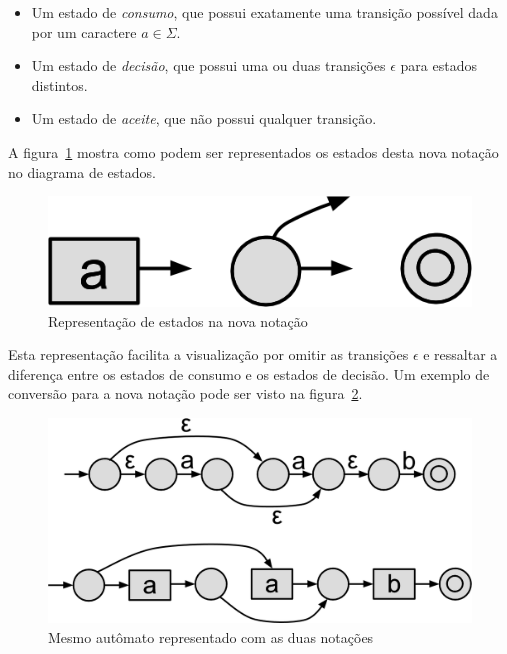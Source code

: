 \documentclass[a4paper,12pt,oneside,onecolumn]{uerj}
\begin{document}
\begin{itemize}
    \item Um estado de \emph{consumo}, que possui exatamente uma transição possível dada por um caractere $a \in \Sigma$.
    \item Um estado de \emph{decisão}, que possui uma ou duas transições $\epsilon$ para estados distintos.
    \item Um estado de \emph{aceite}, que não possui qualquer transição.
\end{itemize}

A figura~\ref{fig:nova_notacao} mostra como podem ser representados os estados desta nova notação no diagrama de estados.

\begin{figure}[ht]
  \centering
  \includegraphics[scale=0.5]{figures/nova_notacao.png}
  \caption{Representação de estados na nova notação}
  \label{fig:nova_notacao}
\end{figure}

Esta representação facilita a visualização por omitir as transições $\epsilon$ e ressaltar a diferença entre os estados de consumo e os estados de decisão. Um exemplo de conversão para a nova notação pode ser visto na figura~\ref{fig:exemplo_nova_notacao}.

\begin{figure}[ht]
  \centering
  \includegraphics[scale=0.25]{figures/exemplo_nova_notacao.png}
  \caption{Mesmo autômato representado com as duas notações}
  \label{fig:exemplo_nova_notacao}
\end{figure}
\end{document}
